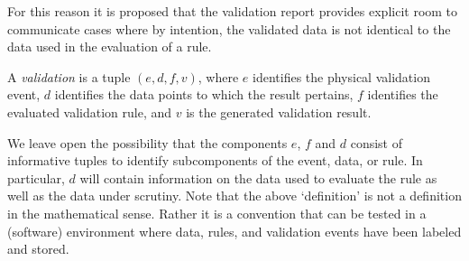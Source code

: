 For this reason it is proposed that the validation report provides explicit
room to communicate cases where by intention, the validated data is not
identical to the data used in the evaluation of a rule. 
%
\begin{definition}[validation] 
A \emph{validation} is a tuple $(e,d,f,v)$, where $e$ identifies the physical
validation event, $d$ identifies the data points to which the result pertains,
$f$ identifies the evaluated validation rule, and $v$ is the generated
validation result.
\label{def:confrontation}
\end{definition}
%
We leave open the possibility that the components $e$, $f$ and $d$ consist of
informative tuples to identify subcomponents of the event, data, or rule.  In
particular, $d$ will contain information on the data used to evaluate the rule
as well as the data under scrutiny. Note that the above `definition' is not a
definition in the mathematical sense.  Rather it is a convention that can be
tested in a (software) environment where data, rules, and validation events
have been labeled and stored.






